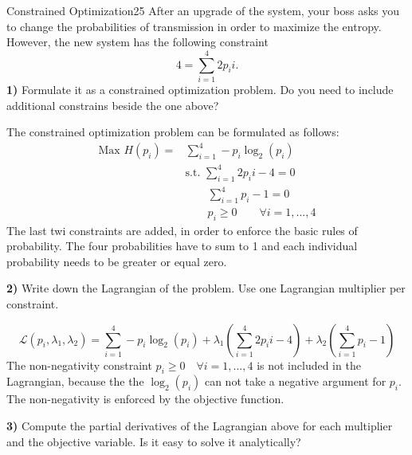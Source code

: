 \begin{questions}
\begin{question}{Constrained Optimization}{25}
After an upgrade of the system, your boss asks you to change the probabilities of transmission in order to maximize the entropy. However, the new system has the following constraint
\begin{equation*}
    4 = \sum_{i=1}^4 2p_i i.
\end{equation*}
\textbf{1)} Formulate it as a constrained optimization problem. Do you need to include additional constrains beside the one above?
\\
\begin{answer}
The constrained optimization problem can be formulated as follows:
\begin{equation*}
\begin{split}
\mbox{Max }H(p_{i}) = 
&\sum_{i=1}^4 - p_{i}\log_{2}(p_i) \\
&\mbox{s.t. } \sum_{i=1}^4 2p_{i}i - 4 = 0 \\
&\qquad \sum_{i=1}^4 p_{i} - 1 = 0 \\
& \qquad p_{i} \geq 0 \qquad \forall i = 1,...,4
\end{split}
\end{equation*}
The last twi constraints are added, in order to enforce the basic rules of probability. The four probabilities have to sum to 1 and each individual probability needs to be greater or equal zero.
\end{answer}
\textbf{2)} Write down the Lagrangian of the problem. Use one Lagrangian multiplier per constraint.
\\
\begin{answer}
\begin{equation*}
\mathcal{L}(p_{i},\lambda_{1},\lambda_{2})= \sum_{i=1}^4 - p_{i}\log_{2}(p_i) + \lambda_{1}(\sum_{i=1}^4 2p_{i}i - 4)+ \lambda_{2}(\sum_{i=1}^4 p_{i} - 1)
\end{equation*}
The non-negativity constraint $ p_{i} \geq 0 \quad \forall i = 1,...,4$ is not included in the Lagrangian, because the the $\log_{2}(p_{i})$ can not take a negative argument for $p_{i}$. The non-negativity is enforced by the objective function. 
\end{answer}
\textbf{3)} Compute the partial derivatives of the Lagrangian above for each multiplier and the objective variable. Is it easy to solve it analytically? 
\\
\begin{answer}
\begin{equation*}
\begin{split}

\end{split}
\end{equation*}
\end{answer}
\end{question}
\end{questions}
